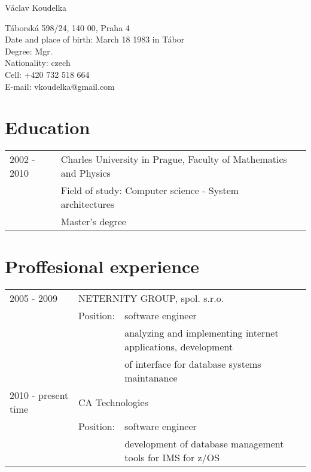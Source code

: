 \documentclass[11pt,letterpaper]{article}
\def\name{Václav Koudelka}
\begin{document}
{\huge \name}


\vspace{0.25in}

\begin{minipage}[t]{0.8\textwidth} 
  Táborská 598/24, 140 00, Praha 4\\
  Date and place of birth: March 18 1983 in Tábor \\
  Degree: Mgr. \\
  Nationality: czech \\
  Cell: +420 732 518 664 \\
  E-mail: vkoudelka@gmail.com \\
\end{minipage}

\section*{Education}

\begin{tabular}{lll}
2002 - 2010 & Charles University in Prague, Faculty of Mathematics and Physics \\
      & Field of study: Computer science - System architectures \\
      & Master's degree       
\end{tabular}

\section*{Proffesional experience}

\begin{tabular}{lll}
 2005 - 2009 & \multicolumn{2}{l}{NETERNITY GROUP, spol. s.r.o.} \\
             & Position: & software engineer \\
\multirow{2}{10pt}{} &  & analyzing and implementing internet applications, development \\
                  & & of interface for database systems maintanance \\
 2010 - present time & \multicolumn{2}{l}{CA Technologies} \\
             & Position: & software engineer \\
\multirow{2}{10pt}{} &  & development of database management tools for IMS for z/OS \\

\end{tabular}
\end{document}

